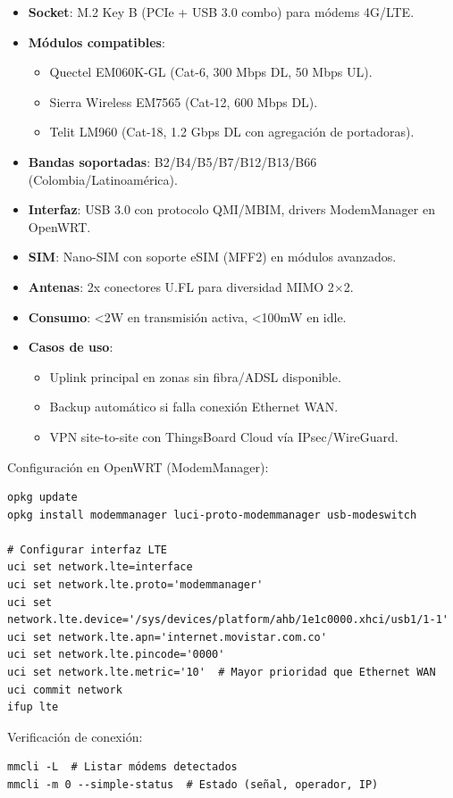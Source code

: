 \begin{itemize}
    \item \textbf{Socket}: M.2 Key B (PCIe + USB 3.0 combo) para módems 4G/LTE.
    \item \textbf{Módulos compatibles}:
    \begin{itemize}
        \item Quectel EM060K-GL (Cat-6, 300 Mbps DL, 50 Mbps UL).
        \item Sierra Wireless EM7565 (Cat-12, 600 Mbps DL).
        \item Telit LM960 (Cat-18, 1.2 Gbps DL con agregación de portadoras).
    \end{itemize}
    \item \textbf{Bandas soportadas}: B2/B4/B5/B7/B12/B13/B66 (Colombia/Latinoamérica).
    \item \textbf{Interfaz}: USB 3.0 con protocolo QMI/MBIM, drivers ModemManager en OpenWRT.
    \item \textbf{SIM}: Nano-SIM con soporte eSIM (MFF2) en módulos avanzados.
    \item \textbf{Antenas}: 2x conectores U.FL para diversidad MIMO 2$\times$2.
    \item \textbf{Consumo}: <2W en transmisión activa, <100mW en idle.
    \item \textbf{Casos de uso}:
    \begin{itemize}
        \item Uplink principal en zonas sin fibra/ADSL disponible.
        \item Backup automático si falla conexión Ethernet WAN.
        \item VPN site-to-site con ThingsBoard Cloud vía IPsec/WireGuard.
    \end{itemize}
\end{itemize}

Configuración en OpenWRT (ModemManager):
\begin{verbatim}
opkg update
opkg install modemmanager luci-proto-modemmanager usb-modeswitch

# Configurar interfaz LTE
uci set network.lte=interface
uci set network.lte.proto='modemmanager'
uci set network.lte.device='/sys/devices/platform/ahb/1e1c0000.xhci/usb1/1-1'
uci set network.lte.apn='internet.movistar.com.co'
uci set network.lte.pincode='0000'
uci set network.lte.metric='10'  # Mayor prioridad que Ethernet WAN
uci commit network
ifup lte
\end{verbatim}

Verificación de conexión:
\begin{verbatim}
mmcli -L  # Listar módems detectados
mmcli -m 0 --simple-status  # Estado (señal, operador, IP)
\end{verbatim}

